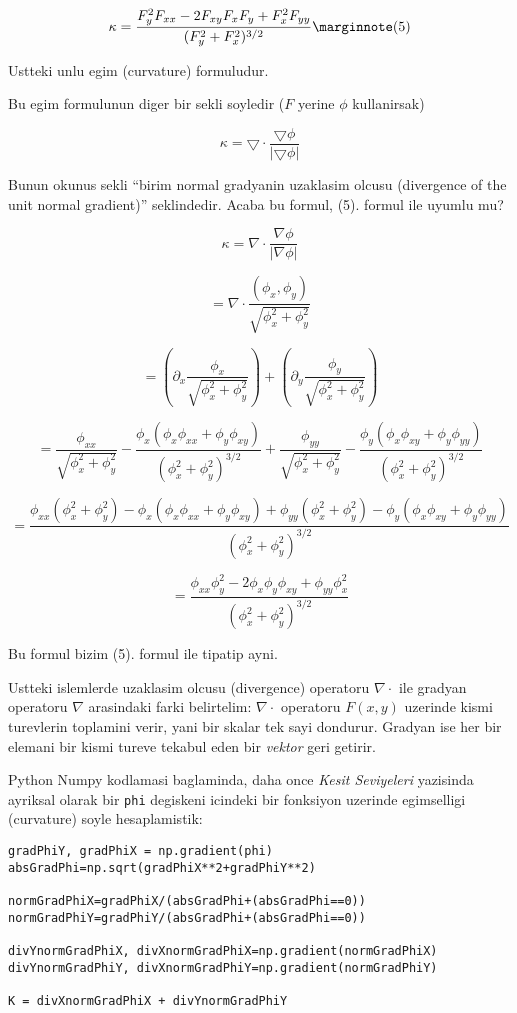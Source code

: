 \documentclass[12pt,fleqn]{article}\usepackage{../common}
\begin{document}
\begin{equation}
\kappa = \frac{F_y^2F_{xx} - 2F_{xy}F_xF_y +
    F_x^2F_{yy}}{(F_y^2 + F_x^2)^{3/2}}
\mlabel{5}
\end{equation}

Ustteki unlu egim (curvature) formuludur. 

Bu egim formulunun diger bir sekli soyledir ($F$ yerine $\phi$ kullanirsak)

\[ \kappa = \bigtriangledown \cdot \frac{\bigtriangledown \phi}{|\bigtriangledown \phi|} \]

Bunun okunus sekli ``birim normal gradyanin uzaklasim olcusu (divergence of the
unit normal gradient)'' seklindedir. Acaba bu formul, (5). formul ile
uyumlu mu?

\[ \kappa = \nabla \cdot \frac{\nabla \phi}{|\nabla \phi|}  \]

\[ = \nabla \cdot \frac{(\phi_x,\phi_y)}{\sqrt{\phi_x^2+\phi_y^2}} \]

\[ = \left(\partial_x \frac{\phi_x}{\sqrt{\phi_x^2+\phi_y^2}}\right)+ 
\left(\partial_y \frac{\phi_y}{\sqrt{\phi_x^2+\phi_y^2}}\right)  \]

\[ = \frac{\phi_{xx}}{\sqrt{\phi_x^2+\phi_y^2}} - \frac{\phi_x (\phi_x\phi_{xx}+\phi_y\phi_{xy})}
{(\phi_x^2+\phi_y^2)^{3/2}} +
\frac{\phi_{yy}}{\sqrt{\phi_x^2+\phi_y^2}} - \frac{\phi_y(\phi_x\phi_{xy}+\phi_y\phi_{yy})}
{(\phi_x^2+\phi_y^2)^{3/2}}  \]

\[ = \frac{\phi_{xx}(\phi_x^2+\phi_y^2) - \phi_x
  (\phi_x\phi_{xx}+\phi_y\phi_{xy}) +\phi_{yy}(\phi_x^2+\phi_y^2) -
  \phi_y(\phi_x\phi_{xy}+\phi_y\phi_{yy})}{(\phi_x^2+\phi_y^2)^{3/2}} \]

\[ = \frac{\phi_{xx}\phi_y^2 - 2\phi_x\phi_y\phi_{xy} + \phi_{yy}\phi_x^2}{(\phi_x^2+\phi_y^2)^{3/2}}  \]

Bu formul bizim (5). formul ile tipatip ayni.

Ustteki islemlerde uzaklasim olcusu (divergence) operatoru $\nabla \cdot$ ile
gradyan operatoru $\nabla$ arasindaki farki belirtelim:  $\nabla \cdot$
operatoru $F(x,y)$ uzerinde kismi turevlerin toplamini verir, yani bir skalar
tek sayi dondurur. Gradyan ise her bir elemani bir kismi tureve tekabul eden bir
{\em vektor} geri getirir. 

Python Numpy kodlamasi baglaminda, daha once {\em Kesit Seviyeleri} yazisinda
ayriksal olarak bir \verb!phi! degiskeni icindeki bir fonksiyon uzerinde
egimselligi (curvature) soyle hesaplamistik:

\begin{verbatim}
gradPhiY, gradPhiX = np.gradient(phi)
absGradPhi=np.sqrt(gradPhiX**2+gradPhiY**2)                               

normGradPhiX=gradPhiX/(absGradPhi+(absGradPhi==0))
normGradPhiY=gradPhiY/(absGradPhi+(absGradPhi==0))

divYnormGradPhiX, divXnormGradPhiX=np.gradient(normGradPhiX)
divYnormGradPhiY, divXnormGradPhiY=np.gradient(normGradPhiY)
                       
K = divXnormGradPhiX + divYnormGradPhiY
\end{verbatim}
\end{document}
